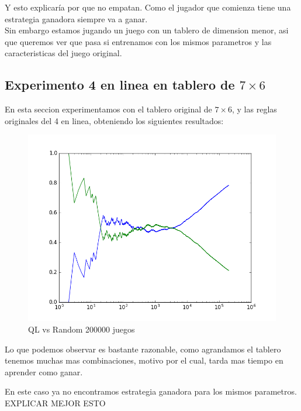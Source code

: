 Y esto explicaría por que no empatan. Como el jugador que comienza tiene una estrategia ganadora siempre va a ganar.\\

Sin embargo estamos jugando un juego con un tablero de dimension menor, asi que queremos ver que pasa si entrenamos
 con los mismos parametros y las caracteristicas del juego original.

\subsection{Experimento 4 en linea en tablero de $7\times6$}
En esta seccion experimentamos con el tablero original de $7\times6$, y las reglas originales del 4 en linea, obteniendo
los siguientes resultados:

\begin{figure}[h]
 \centering
  \begin{minipage}[c]{1\textwidth}
	\centering
	\includegraphics[scale=0.5]{img/QlearningRandomEgreedy2000007x6(4).png}
        \caption{QL vs Random 200000 juegos}
  \end{minipage}
\end{figure}

Lo que podemos observar es bastante razonable, como agrandamos el tablero tenemos muchas mas combinaciones, motivo por el cual,
 tarda mas tiempo en aprender como ganar.

En este caso ya no encontramos estrategia ganadora para los mismos parametros.
{\huge EXPLICAR MEJOR ESTO}\\


